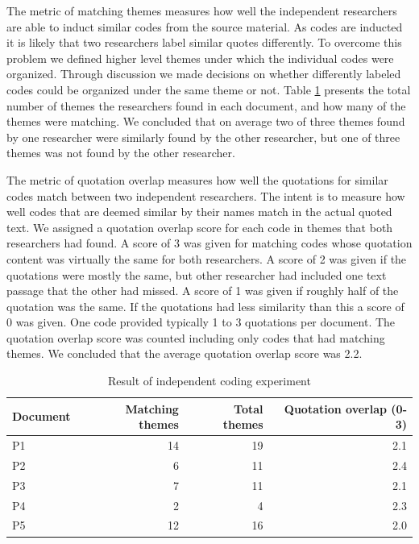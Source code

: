 The metric of matching themes measures how well the independent researchers are
able to induct similar codes from the source material. As codes are inducted it
is likely that two researchers label similar quotes differently. To overcome
this problem we defined higher level themes under which the individual codes
were organized. Through discussion we made decisions on whether differently
labeled codes could be organized under the same theme or not. Table
\ref{table:codingexperiment} presents the total number of themes the researchers
found in each document, and how many of the themes were matching. We concluded
that on average two of three themes found by one researcher were similarly found
by the other researcher, but one of three themes was not found by the other
researcher.

The metric of quotation overlap measures how well the quotations for similar
codes match between two independent researchers. The intent is to measure how
well codes that are deemed similar by their names match in the actual quoted
text. We assigned a quotation overlap score for each code in themes that both
researchers had found. A score of 3 was given for matching codes whose quotation
content was virtually the same for both researchers. A score of 2 was given if
the quotations were mostly the same, but other researcher had included one text
passage that the other had missed. A score of 1 was given if roughly half of the
quotation was the same. If the quotations had less similarity than this a score
of 0 was given. One code provided typically 1 to 3 quotations per document. The
quotation overlap score was counted including only codes that had matching
themes. We concluded that the average quotation overlap score was 2.2.

\begin{table}
    \centering
    \begin{tabular}{ l r r r }
        \toprule
        Document    &  Matching themes  &  Total themes  &  Quotation overlap (0-3) \\
        \midrule
        P1          &  14  &  19   &  2.1  \\
        P2          &   6  &  11   &  2.4  \\
        P3          &   7  &  11   &  2.1  \\
        P4          &   2  &   4   &  2.3  \\
        P5          &  12  &  16   &  2.0  \\
        \bottomrule
    \end{tabular}
    \caption{Result of independent coding experiment}
    \label{table:codingexperiment}
\end{table}


